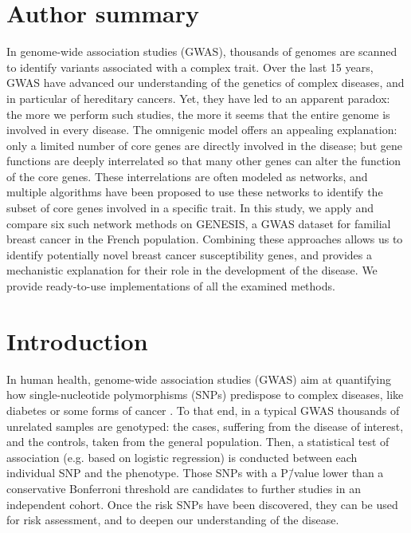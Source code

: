 \documentclass[10pt,letterpaper]{article}
\begin{document}
\section*{Author summary}
In genome-wide association studies (GWAS), thousands of genomes are scanned to identify variants associated with a complex trait. Over the last 15 years, GWAS have advanced our understanding of the genetics of complex diseases, and in particular of hereditary cancers. Yet, they have led to an apparent paradox: the more we perform such studies, the more it seems that the entire genome is involved in every disease. The omnigenic model offers an appealing explanation: only a limited number of core genes are directly involved in the disease; but gene functions are deeply interrelated so that many other genes can alter the function of the core genes. These interrelations are often modeled as networks, and multiple algorithms have been proposed to use these networks to identify the subset of core genes involved in a specific trait. In this study, we apply and compare six such network methods on GENESIS, a GWAS dataset for familial breast cancer in the French population. Combining these approaches allows us to identify potentially novel breast cancer susceptibility genes, and provides a mechanistic explanation for their role in the development of the disease. We provide ready-to-use implementations of all the examined methods.
\linenumbers

\section{Introduction}

In human health, genome-wide association studies (GWAS) aim at quantifying how single-nucleotide polymorphisms (SNPs) predispose to complex diseases, like diabetes or some forms of cancer \cite{bush_chapter_2012}. To that end, in a typical GWAS thousands of unrelated samples are genotyped: the cases, suffering from the disease of interest, and the controls, taken from the general population. Then, a statistical test of association (e.g. based on logistic regression) is conducted between each individual SNP and the phenotype. Those SNPs with a P\=/value lower than a conservative Bonferroni threshold are candidates to further studies in an independent cohort. Once the risk SNPs have been discovered, they can be used for risk assessment, and to deepen our understanding of the disease.
\end{document}
